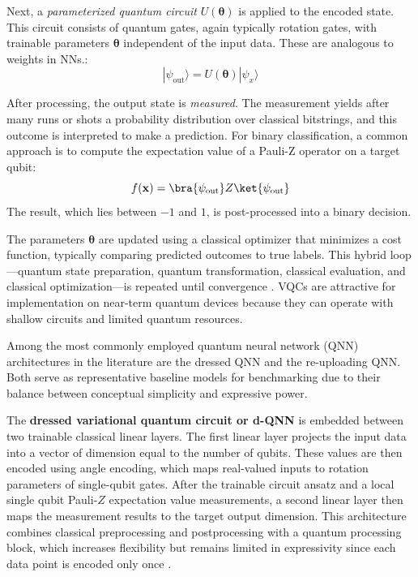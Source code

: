 Next, a \textit{parameterized quantum circuit} $U(\boldsymbol{\theta})$ is applied to the encoded state. This circuit consists of quantum gates, again typically rotation gates, with trainable parameters $\boldsymbol{\theta}$ independent of the input data. These are analogous to weights in NNs.:
\[
|\psi_{\text{out}}\rangle = U(\boldsymbol{\theta}) |\psi_x\rangle
\]

After processing, the output state is \textit{measured}. The measurement yields after many runs or shots a probability distribution over classical bitstrings, and this outcome is interpreted to make a prediction. For binary classification, a common approach is to compute the expectation value of a Pauli-Z operator on a target qubit:
\[
f(\mathbf{x}) = \bra{\psi_{\text{out}}} Z \ket{\psi_{\text{out}}}
\]
The result, which lies between $-1$ and $1$, is post-processed into a binary decision.

The parameters $\boldsymbol{\theta}$ are updated using a classical optimizer that minimizes a cost function, typically comparing predicted outcomes to true labels. This hybrid loop—quantum state preparation, quantum transformation, classical evaluation, and classical optimization—is repeated until convergence \parencite{schuld2018circuit}. VQCs are attractive for implementation on near-term quantum devices because they can operate with shallow circuits and limited quantum resources. 




Among the most commonly employed quantum neural network (QNN) architectures in the literature are the dressed QNN and the re-uploading QNN. Both serve as representative baseline models for benchmarking due to their balance between conceptual simplicity and expressive power. 

The\textbf{ dressed variational quantum circuit or d-QNN} is embedded between two trainable classical linear layers. The first linear layer projects the input data into a vector of dimension equal to the number of qubits. These values are then encoded using angle encoding, which maps real-valued inputs to rotation parameters of single-qubit gates. After the trainable circuit ansatz and a local single qubit Pauli-$Z$ expectation value measurements, a second linear layer then maps the measurement results to the target output dimension. This architecture combines classical preprocessing and postprocessing with a quantum processing block, which increases flexibility but remains limited in expressivity since each data point is encoded only once \parencite{fellner2025quantum}.  

